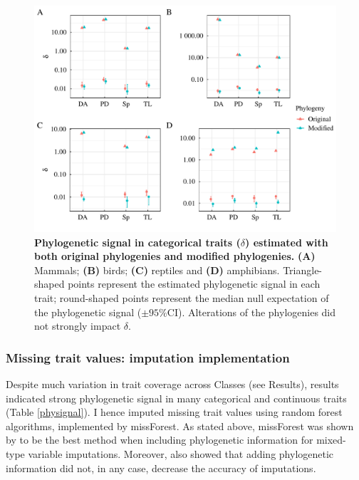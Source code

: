 \begin{figure}[h!]
\centering
\includegraphics[scale=0.5]{figures/chapter2/Phylosignal/Categorical}
\caption[Phylogenetic signal in categorical traits ($\delta$) estimated with both original phylogenies and modified phylogenies]{\textbf{Phylogenetic signal in categorical traits ($\delta$) estimated with both original phylogenies and modified phylogenies.} \textbf{(A)} Mammals; \textbf{(B)} birds; \textbf{(C)} reptiles and \textbf{(D)} amphibians. Triangle-shaped points represent the estimated phylogenetic signal in each trait; round-shaped points represent the median null expectation of the phylogenetic signal ($\pm95\%$CI). Alterations of the phylogenies did not strongly impact $\delta$.}
\label{signalcategorical}
\end{figure}

\pagebreak


\subsubsection{Missing trait values: imputation implementation}
Despite much variation in trait coverage across Classes (see Results), results indicated strong phylogenetic signal in many categorical and continuous traits (Table \ref{physignal}). 
I hence imputed missing trait values using random forest algorithms, implemented by missForest. As stated above, missForest was shown by \citet{Penone2014} to be the best method when including phylogenetic information for mixed-type variable imputations. Moreover, \citet{Penone2014} also showed that adding phylogenetic information did not, in any case, decrease the accuracy of imputations. 

